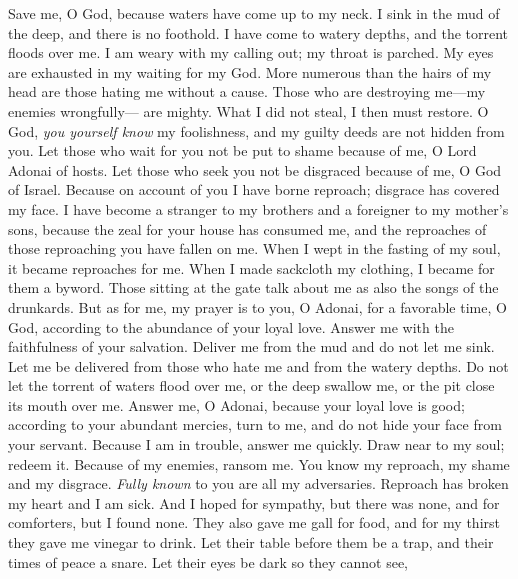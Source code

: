 \begin{biblechapter} %
 Save me, O God, 
because waters have come up to my neck.
\verse I sink in the mud of the deep, and there is no foothold. 
I have come to watery depths, 
and the torrent floods over me.
\verse I am weary with my calling out; my throat is parched. 
My eyes are exhausted in my waiting for my God.
\verse More numerous than the hairs of my head 
are those hating me without a cause. 
Those who are destroying me—my enemies wrongfully— are mighty. 
What I did not steal, I then must restore.
\verse O God, \textit{you yourself know} my foolishness, 
and my guilty deeds are not hidden from you.
\verse Let those who wait for you not be put to shame because of me, 
O Lord Adonai of hosts. 
Let those who seek you not be disgraced because of me, 
O God of Israel.
\verse Because on account of you I have borne reproach; 
disgrace has covered my face.
\verse I have become a stranger to my brothers 
and a foreigner to my mother’s sons,
\verse because the zeal for your house has consumed me, 
and the reproaches of those reproaching you have fallen on me.
\verse When I wept in the fasting of my soul, 
it became reproaches for me.
\verse When I made sackcloth my clothing, 
I became for them a byword.
\verse Those sitting at the gate talk about me 
as also the songs of the drunkards.
\verse But as for me, my prayer is to you, O Adonai, for a favorable time, 
O God, according to the abundance of your loyal love. 
Answer me with the faithfulness of your salvation.
\verse Deliver me from the mud and do not let me sink. 
Let me be delivered from those who hate me 
and from the watery depths.
\verse Do not let the torrent of waters flood over me, 
or the deep swallow me, 
or the pit close its mouth over me.
\verse Answer me, O Adonai, because your loyal love is good; 
according to your abundant mercies, turn to me,
\verse and do not hide your face from your servant. 
Because I am in trouble, answer me quickly.
\verse Draw near to my soul; redeem it. 
Because of my enemies, ransom me.
\verse You know my reproach, my shame and my disgrace. 
\textit{Fully known} to you are all my adversaries.
\verse Reproach has broken my heart and I am sick. 
And I hoped for sympathy, but there was none, 
and for comforters, but I found none.
\verse They also gave me gall for food, 
and for my thirst they gave me vinegar to drink.
\verse Let their table before them be a trap, 
and their times of peace a snare.
\verse Let their eyes be dark so they cannot see, 

\end{biblechapter}
